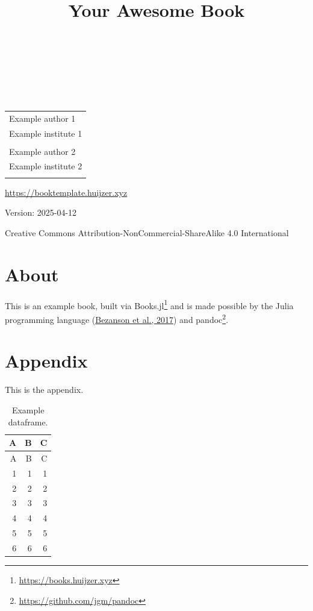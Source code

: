 \documentclass[
  notoc %
]{tufte-book}
\title{Your Awesome Book}
\author{\noindent{Example author 1}\\[3mm] \noindent{Example author
2}\\[3mm] }
\date{}
\DeclareRobustCommand{\href}[2]{#2\footnote{\url{#1}}}
\begin{document}
\makeatletter
\thispagestyle{empty}
\vfill
{\Huge\bf
\noindent
\@title
}\\[1in]
{\Large
\noindent
\@author
}
\makeatother

\makeatletter
\newpage
\thispagestyle{empty}
\vfill
{\noindent
\begin{tabular}{l} Example author 1\\ Example institute 1\\ \\ Example author 2\\ Example institute 2\\ \\ \end{tabular}
}
\vfill
{\small
\url{https://booktemplate.huijzer.xyz}

Version: 2025-04-12

Creative Commons Attribution-NonCommercial-ShareAlike 4.0 International
}
\makeatother


\frontmatter
\mainmatter
{}

\setcounter{tocdepth}{1}
\tableofcontents

\justifying

\setlength{\parindent}{0pt}

\hypertarget{sec:about}{%
\chapter{About}\label{sec:about}}

This is an example book, built via
\href{https://books.huijzer.xyz}{Books.jl} and is made possible by the
Julia programming language
(\protect\hyperlink{ref-bezanson2017julia}{Bezanson et al., 2017}) and
\href{https://github.com/jgm/pandoc}{pandoc}.

\hypertarget{appendix}{%
\chapter*{Appendix}\label{appendix}}

This is the appendix.

\hypertarget{tbl:example_dataframe}{}
\begin{longtable}[]{@{}rrr@{}}
\caption{\label{tbl:example_dataframe}Example dataframe.}\tabularnewline
\toprule()
A & B & C \\
\midrule()
\endfirsthead
\toprule()
A & B & C \\
\midrule()
\endhead
1 & 1 & 1 \\
2 & 2 & 2 \\
3 & 3 & 3 \\
4 & 4 & 4 \\
5 & 5 & 5 \\
6 & 6 & 6 \\
\bottomrule()
\end{longtable}
\end{document}
